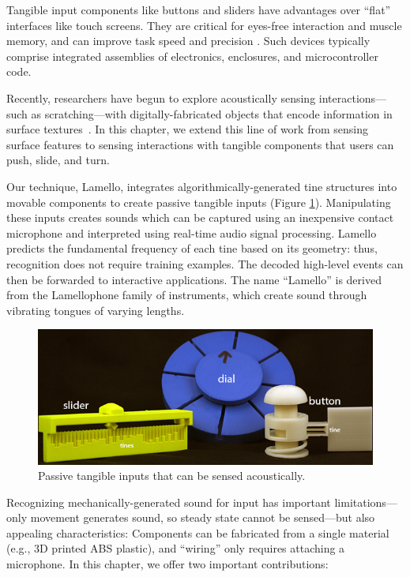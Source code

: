 Tangible input components like buttons and sliders
have advantages over ``flat'' interfaces like touch screens. They are critical for eyes-free interaction and muscle memory, and can improve task speed and precision \cite{klemmer-bodies}. Such devices typically comprise integrated assemblies of electronics, enclosures, and microcontroller code.

Recently, researchers have begun to explore acoustically sensing interactions---such as scratching---with digitally-fabricated objects that encode information in surface textures~\cite{harrison-acoustic,murray-smith-stane}. In this chapter, we extend this line of work from sensing surface features to sensing interactions with tangible components that users can push, slide, and turn.

Our technique, Lamello, integrates algorithmically-generated tine structures into movable components to create passive tangible inputs (Figure \ref{fig:lamello-pretty-components}). Manipulating these inputs creates sounds which can be captured using an inexpensive contact microphone and interpreted using real-time audio signal processing. Lamello predicts the fundamental frequency of each tine based on its geometry: thus, recognition does not require training examples. The decoded high-level events can then be forwarded to interactive applications. The name ``Lamello'' is derived from the Lamellophone family of instruments, which create sound through vibrating tongues of varying lengths. 

\begin{figure}[t]
  \centering
    \includegraphics[width=\textwidth]{figures/lamello/fig1-labels-new.jpg}
   \caption{Passive tangible inputs that can be sensed acoustically. %
   }
   \label{fig:lamello-pretty-components}
\end{figure}

Recognizing mechanically-generated sound for input has important limitations---only movement generates sound, so steady state cannot be sensed---but also appealing characteristics: Components can be fabricated from a single material (e.g., 3D printed ABS plastic), and ``wiring'' only requires attaching a microphone. In this chapter, we offer two important contributions:

